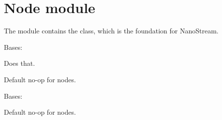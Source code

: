 \documentclass[letterpaper,10pt,english]{sphinxmanual}
\begin{document}
\section{Node module}
\label{\detokenize{api:node-module}}
The  module contains the  class, which is the foundation
for NanoStream.

\begin{fulllineitems}
\label{\detokenize{api:nanostream.node.AggregateValues}}
Bases: {\hyperref[\detokenize{api:nanostream.node.NanoNode}]{}}

Does that.

\begin{fulllineitems}
\label{\detokenize{api:nanostream.node.AggregateValues.process_item}}
Default no-op for nodes.

\end{fulllineitems}


\end{fulllineitems}


\begin{fulllineitems}
\label{\detokenize{api:nanostream.node.BatchMessages}}
Bases: {\hyperref[\detokenize{api:nanostream.node.NanoNode}]{}}

\begin{fulllineitems}
\label{\detokenize{api:nanostream.node.BatchMessages.cleanup}}
\end{fulllineitems}


\begin{fulllineitems}
\label{\detokenize{api:nanostream.node.BatchMessages.process_item}}
Default no-op for nodes.

\end{fulllineitems}


\end{fulllineitems}
\end{document}
